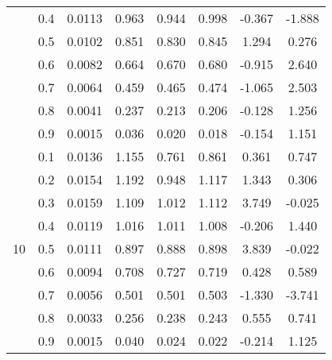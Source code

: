 \documentclass[11pt,a4paper]{report}
\begin{document}
\begin{longtable}{ | c | c || c | c | c | c | c | c | }
 & 0.4 & 0.0113 & 0.963 & 0.944 & 0.998 & -0.367 & -1.888 \\
 & 0.5 & 0.0102 & 0.851 & 0.830 & 0.845 & 1.294 & 0.276 \\
 & 0.6 & 0.0082 & 0.664 & 0.670 & 0.680 & -0.915 & 2.640 \\
 & 0.7 & 0.0064 & 0.459 & 0.465 & 0.474 & -1.065 & 2.503 \\
 & 0.8 & 0.0041 & 0.237 & 0.213 & 0.206 & -0.128 & 1.256 \\
 & 0.9 & 0.0015 & 0.036 & 0.020 & 0.018 & -0.154 & 1.151 \\
 \hline
\multirow{9}{*}{10} & 0.1 & 0.0136 & 1.155 & 0.761 & 0.861 & 0.361 & 0.747 \\
 & 0.2 & 0.0154 & 1.192 & 0.948 & 1.117 & 1.343 & 0.306 \\
 & 0.3 & 0.0159 & 1.109 & 1.012 & 1.112 & 3.749 & -0.025 \\
 & 0.4 & 0.0119 & 1.016 & 1.011 & 1.008 & -0.206 & 1.440 \\
 & 0.5 & 0.0111 & 0.897 & 0.888 & 0.898 & 3.839 & -0.022 \\
 & 0.6 & 0.0094 & 0.708 & 0.727 & 0.719 & 0.428 & 0.589 \\
 & 0.7 & 0.0056 & 0.501 & 0.501 & 0.503 & -1.330 & -3.741 \\
 & 0.8 & 0.0033 & 0.256 & 0.238 & 0.243 & 0.555 & 0.741 \\
 & 0.9 & 0.0015 & 0.040 & 0.024 & 0.022 & -0.214 & 1.125 \\
 \hline
\hline
\end{longtable}
\end{document}
